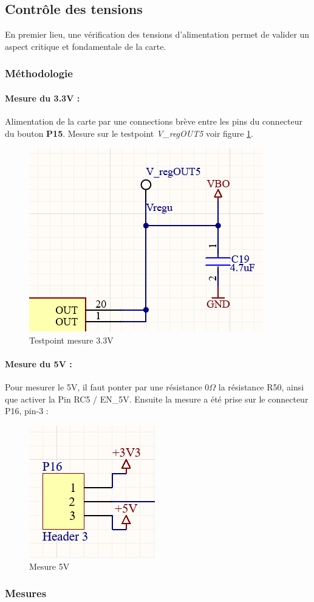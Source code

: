 \subsection{Contrôle des tensions}
{
	En premier lieu, une vérification des tensions d'alimentation permet de valider un aspect critique et fondamentale de la carte.
	\subsubsection{Méthodologie}
	\paragraph{Mesure du 3.3V :} Alimentation de la carte par une connections brève entre les pins du connecteur du bouton \textbf{P15}. Mesure sur le testpoint \textit{V\_regOUT5} voir figure \ref{fig:sch3}.
	\begin{figure}[h]
		\centering
		\includegraphics[width=0.3\linewidth]{Figures/DEV_MEAS/Sch3.3V}
		\caption{Testpoint mesure 3.3V}
		\label{fig:sch3}
	\end{figure}
	
	\paragraph{Mesure du 5V :} Pour mesurer le 5V, il faut ponter par une résistance $0\Omega$ la résistance R50, ainsi que activer la Pin RC5 / EN\_5V. Ensuite la mesure a été prise sur le connecteur P16, pin-3 :
	\begin{figure}[h]
		\centering
		\includegraphics[width=0.3\linewidth]{Figures/DEV_MEAS/Sch5V}
		\caption{Mesure 5V}
		\label{fig:sch5v}
	\end{figure}

	\clearpage
	\subsubsection{Mesures}
	
	
}

